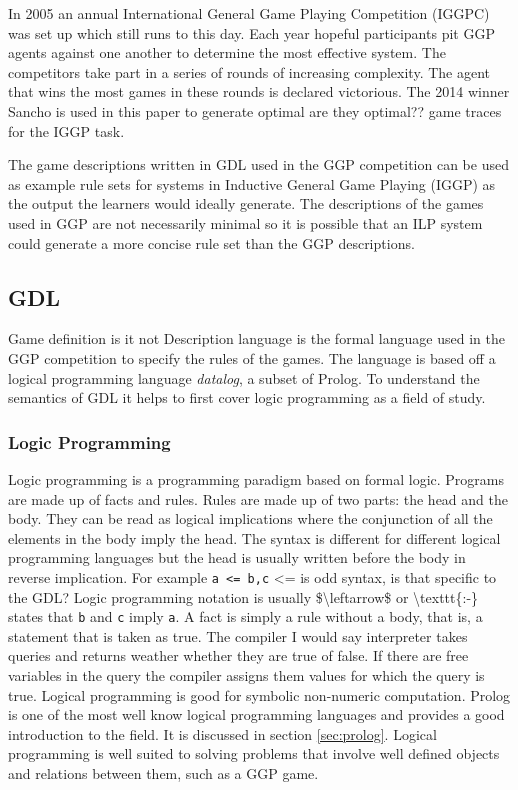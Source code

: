 In 2005 an annual International General Game Playing Competition (IGGPC) was set up which still runs to this day\cite{Kowalski/GGP}. Each year hopeful participants pit GGP agents against one another to determine the most effective system. The competitors take part in a series of rounds of increasing complexity. The agent that wins the most games in these rounds is declared victorious. The 2014 winner Sancho is used in this paper to generate optimal \ac{are they optimal??} game traces for the IGGP task.

The game descriptions written in GDL used in the GGP competition can be used as example rule sets for systems in Inductive General Game Playing (IGGP) as the output the learners would ideally generate. The descriptions of the games used in GGP are not necessarily minimal so it is possible that an ILP system could generate a more concise rule set than the GGP descriptions.

\subsection{GDL}\label{sec:GDL}
Game definition \ac{is it not Description} language is the formal language used in the GGP competition to specify the rules of the games\cite{GDL_Spec}. The language is based off a logical programming language \textit{datalog}, a subset of Prolog. To understand the semantics of GDL it helps to first cover logic programming as a field of study.
\subsubsection{Logic Programming}
Logic programming is a programming paradigm based on formal logic. Programs are made up of facts and rules. Rules are made up of two parts: the head and the body. They can be read as logical implications where the conjunction of all the elements in the body imply the head. The syntax is different for different logical programming languages but the head is usually written before the body in reverse implication. For example \texttt{a <= b,c}  \ac{<= is odd syntax, is that specific to the GDL? Logic programming notation is usually $\leftarrow$ or \texttt{:-}} states that \texttt{b} and \texttt{c} imply \texttt{a}. A fact is simply a rule without a body, that is, a statement that is taken as true. The compiler \ac{I would say interpreter} takes queries and returns weather \ac{whether} they are true \ac{of} false. If there are free variables in the query the compiler assigns them values for which the query is true. Logical programming is good for symbolic non-numeric computation\cite{Bratko}. Prolog is one of the most well know logical programming languages\cite{SWIPL} and provides a good introduction to the field. It is discussed in section \ref{sec:prolog}. Logical programming is well suited to solving problems that involve well defined objects and relations between them, such as a GGP game.
